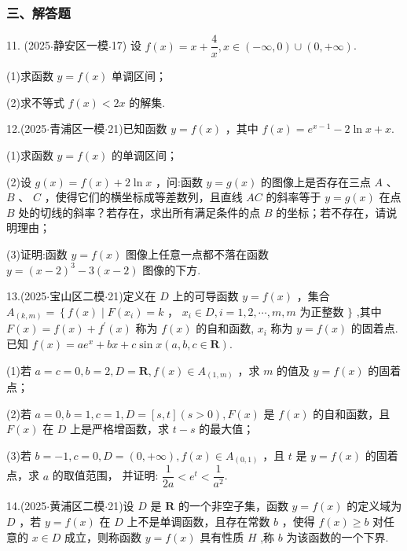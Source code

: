 \subsubsection*{三、解答题}

11. (2025$\cdot$静安区一模$\cdot$17) 设 $f\left( x\right)  = x + \dfrac{4}{x},x \in  \left( {-\infty ,0}\right)  \cup  \left( {0, + \infty }\right)$.

(1)求函数 $y = f\left( x\right)$ 单调区间；

(2)求不等式 $f\left( x\right)  < {2x}$ 的解集.

12.(2025$\cdot$青浦区一模$\cdot$21)已知函数 $y = f\left( x\right)$ ，其中 $f\left( x\right)  = {{e}}^{x - 1} - {2\ln }x + x$.

(1)求函数 $y = f\left( x\right)$ 的单调区间；

(2)设 $g\left( x\right)  = f\left( x\right)  + 2\ln x$ ，问:函数 $y = g\left( x\right)$ 的图像上是否存在三点 $A$ 、 $B$ 、 $C$ ，使得它们的横坐标成等差数列，且直线 ${AC}$ 的斜率等于 $y = g\left( x\right)$ 在点 $B$ 处的切线的斜率？若存在，求出所有满足条件的点 $B$ 的坐标；若不存在，请说明理由；

(3)证明:函数 $y = f\left( x\right)$ 图像上任意一点都不落在函数 $y = {\left( x - 2\right) }^{3} - 3\left( {x - 2}\right)$ 图像的下方.

13.(2025$\cdot$宝山区二模$\cdot$21)定义在 $D$ 上的可导函数 $y = f\left( x\right)$ ，集合 ${A}_{\left( k,m\right) } = \left\{  {f\left( x\right)  \mid  F\left( {x}_{i}\right)  = k}\right.$ ， ${x}_{i} \in  D,i = 1,2,\cdots ,m,m$ 为正整数 $\}$ ,其中 $F\left( x\right)  = f\left( x\right)  + {f}^{\prime }\left( x\right)$ 称为 $f\left( x\right)$ 的自和函数, ${x}_{i}$ 称为 $y = f\left( x\right)$ 的固着点. 已知 $f\left( x\right)  = a{e}^{x} + {bx} + c\sin x\left( {a,b,c \in  \mathbf{R}}\right)$.

(1)若 $a = c = 0,b = 2,D = \mathbf{R},f\left( x\right)  \in  {A}_{\left( 1,m\right) }$ ，求 $m$ 的值及 $y = f\left( x\right)$ 的固着点；

(2)若 $a = 0,b = 1,c = 1,D = \left\lbrack  {s,t}\right\rbrack  \left( {s > 0}\right) ,F\left( x\right)$ 是 $f\left( x\right)$ 的自和函数，且 $F\left( x\right)$ 在 $D$ 上是严格增函数，求 $t - s$ 的最大值；

(3)若 $b =  - 1,c = 0,D = \left( {0, + \infty }\right) ,f\left( x\right)  \in  {A}_{\left( 0,1\right) }$ ，且 $t$ 是 $y = f\left( x\right)$ 的固着点，求 $a$ 的取值范围， 并证明: $\dfrac{1}{2a} < {{e}}^{t} < \dfrac{1}{{a}^{2}}$.

14.(2025$\cdot$黄浦区二模$\cdot$21)设 $D$ 是 $\mathbf{R}$ 的一个非空子集，函数 $y = f\left( x\right)$ 的定义域为 $D$ ，若 $y = f\left( x\right)$ 在 $D$ 上不是单调函数，且存在常数 $b$ ，使得 $f\left( x\right)  \geq  b$ 对任意的 $x \in  D$ 成立，则称函数 $y = f\left( x\right)$ 具有性质 $H$ ,称 $b$ 为该函数的一个下界.

